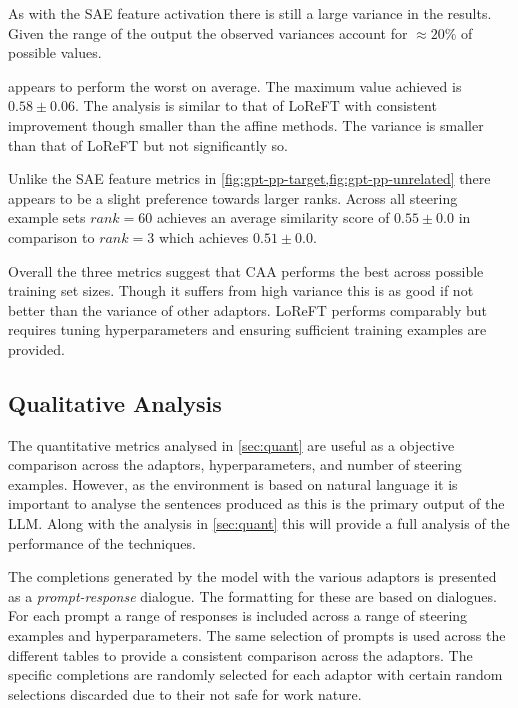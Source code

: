 As with the SAE feature activation there is still a large variance in the results.
Given the range of the output the observed variances account for $\approx 20\%$ of possible values.

 appears to perform the worst on average.
The maximum value achieved is $0.58 \pm 0.06$.
The analysis is similar to that of LoReFT with consistent improvement though smaller than the affine methods.
The variance is smaller than that of LoReFT but not significantly so.

Unlike the SAE feature metrics in \cref{fig:gpt-pp-target,fig:gpt-pp-unrelated} there appears to be a slight preference towards larger ranks.
Across all steering example sets $rank = 60$ achieves an average similarity score of $0.55 \pm 0.0$ in comparison to $rank = 3$ which achieves $0.51 \pm 0.0$.

Overall the three metrics suggest that CAA performs the best across possible training set sizes.
Though it suffers from high variance this is as good if not better than the variance of other adaptors.
LoReFT performs comparably but requires tuning hyperparameters and ensuring sufficient training examples are provided.

\subsection{Qualitative Analysis}
\label{sec:qual}

The quantitative metrics analysed in \cref{sec:quant} are useful as a objective comparison across the adaptors, hyperparameters, and number of steering examples.
However, as the environment is based on natural language it is important to analyse the sentences produced as this is the primary output of the LLM.
Along with the analysis in \cref{sec:quant} this will provide a full analysis of the performance of the techniques.

The completions generated by the model with the various adaptors is presented as a \emph{prompt-response} dialogue.
The formatting for these are based on \cites{mwe} dialogues.
For each prompt a range of responses is included across a range of steering examples and hyperparameters.
The same selection of prompts is used across the different tables to provide a consistent comparison across the adaptors.
The specific completions are randomly selected for each adaptor with certain random selections discarded due to their not safe for work nature.



